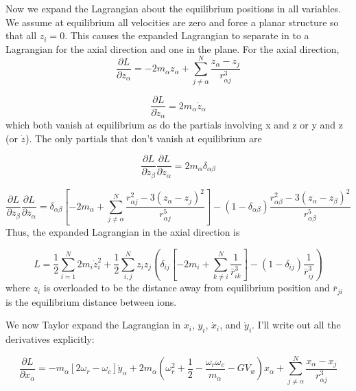 \documentclass[12pt]{article}
\begin{document}
Now we expand the Lagrangian about the equilibrium positions in all variables. We assume at equilibrium all velocities are zero and force a planar structure so that all $z_i = 0$. This causes the expanded Lagrangian to separate in to a Lagrangian for the axial direction and one in the plane.
For the axial direction,
\begin{equation}
\frac{\partial L}{\partial z_{\alpha}} = -2 m_{\alpha}z_{\alpha}+  \sum^N_{j \neq \alpha}\frac{z_{\alpha}-z_j}{r^3_{\alpha j}}
\end{equation}

\begin{equation}
\frac{\partial L}{\partial \dot{z}_{\alpha}} = 2 m_{\alpha}\dot{z}_{\alpha}
\end{equation}
which both vanish at equilibrium as do the partials involving x and z or y and z (or $\dot{z}$). The only partials that don't vanish at equilibrium are

\begin{equation}
\frac{\partial L}{\partial \dot{z}_{\beta}} \frac{\partial L}{\partial \dot{z}_{\alpha}} = 2 m_{\alpha} \delta_{\alpha \beta}
\end{equation}

\begin{equation}
\frac{\partial L}{\partial z_{\beta}}\frac{\partial L}{\partial z_{\alpha}} = \delta_{\alpha \beta} \left[ -2 m_{\alpha}+\sum^N_{j \neq \alpha}\frac{r^2_{\alpha j} -3\left(z_{\alpha}-z_j \right)^2}{r^5_{\alpha j}}\right] - \left(1- \delta_{\alpha \beta} \right) \frac{r^2_{\alpha \beta} -3\left(z_{\alpha}-z_{\beta} \right)^2}{r^5_{\alpha \beta}}
\end{equation}
Thus, the expanded Lagrangian in the axial direction is

\begin{equation}
L = \frac{1}{2}\sum^N_{i=1} 2m_i \dot{z}_i^2 + \frac{1}{2}\sum^N_{i,j} z_i z_j \left( \delta_{i j} \left[ -2 m_{i}+\sum^N_{k \neq i}\frac{1}{\bar{r}^3_{i k}}\right]
-  \left(1- \delta_{i j} \right) \frac{1}{\bar{r}^3_{i j}} \right)
\end{equation}
where $z_i$ is overloaded to be the distance away from equilibrium position and $\bar{r}_{ji}$ is the equilibrium distance between ions.

We now Taylor expand the Lagrangian in $x_i$, $y_i$, $\dot{x}_i$, and $\dot{y}_i$. I'll write out all the derivatives explicitly:

\begin{equation}
\frac{\partial L}{\partial x_{\alpha}} = - m_{\alpha}\left[2\omega_r-\omega_c\right]\dot{y}_{\alpha} + 2m_{\alpha} \left(\omega^2_r +\frac{1}{2} - \frac{\omega_r \omega_c}{m_{\alpha}} - G V_w \right) x_{\alpha} +  \sum^N_{j \neq \alpha}\frac{x_{\alpha}-x_j}{r^3_{\alpha j}}
\end{equation}
\end{document}

